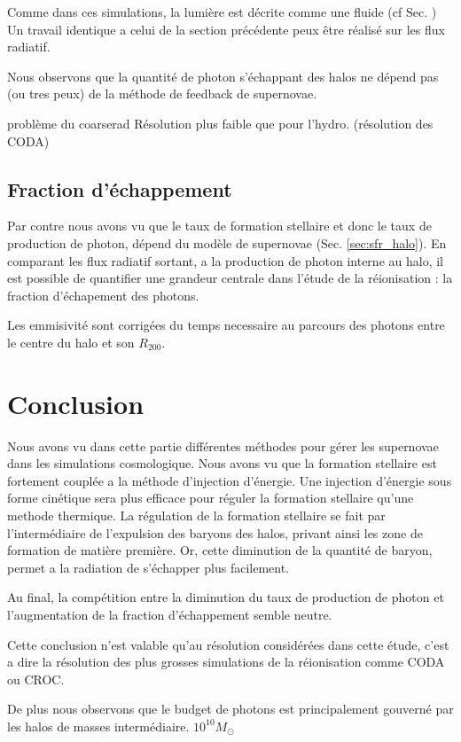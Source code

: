 Comme dans ces simulations, la lumière est décrite comme une fluide (cf Sec. ) %
Un travail identique a celui de la section précédente peux être réalisé sur les flux radiatif.

Nous observons que la quantité de photon s'échappant des halos ne dépend pas (ou tres peux) de la méthode de feedback de supernovae.

problème du coarserad %
Résolution plus faible que pour l'hydro.
(résolution des CODA)




\subsection{Fraction d'échappement}

Par contre nous avons vu que le taux de formation stellaire et donc le taux de production de photon, dépend du modèle de supernovae (Sec. \ref{sec:sfr_halo}).
En comparant les flux radiatif sortant, a la production de photon interne au halo, il est possible de quantifier une grandeur centrale dans l'étude de la réionisation : la fraction d'échapement des photons.

Les emmisivité sont corrigées du temps necessaire au parcours des photons entre le centre du halo et son $R_{200}$.


\section{Conclusion}


Nous avons vu dans cette partie différentes méthodes pour gérer les supernovae dans les simulations cosmologique.
Nous avons vu que la formation stellaire est fortement couplée a la méthode d'injection d'énergie.
Une injection d'énergie sous forme cinétique sera plus efficace pour réguler la formation stellaire qu'une methode thermique.
La régulation de la formation stellaire se fait par l'intermédiaire de l'expulsion des baryons des halos, privant ainsi les zone de formation de matière première.
Or, cette diminution de la quantité de baryon, permet a la radiation de s'échapper plus facilement.

Au final, la compétition entre la diminution du taux de production de photon et l'augmentation de la fraction d'échappement semble neutre.

Cette conclusion n'est valable qu'au résolution considérées dans cette étude, c'est a dire la résolution des plus grosses simulations de la réionisation comme CODA ou CROC. %

De plus nous observons que le budget de photons est principalement gouverné par les halos de masses intermédiaire. $10^{10} M_\odot$







